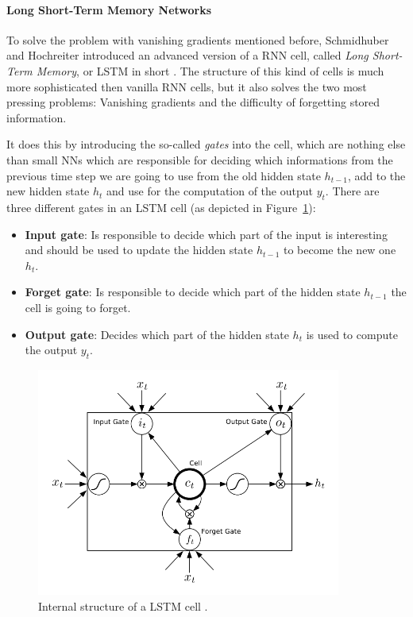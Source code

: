 \paragraph{Long Short-Term Memory Networks} To solve the problem with vanishing gradients mentioned before, Schmidhuber and Hochreiter introduced an advanced version of a RNN cell, called \emph{Long Short-Term Memory}, or LSTM in short \cite{Hochreiter:1997}. The structure of this kind of cells is much more sophisticated then vanilla RNN cells, but it also solves the two most pressing problems: Vanishing gradients and the difficulty of forgetting stored information.

It does this by introducing the so-called \emph{gates} into the cell, which are nothing else than small NNs which are responsible for deciding which informations from the previous time step we are going to use from the old hidden state $h_{t-1}$, add to the new hidden state $h_t$ and use for the computation of the output $y_t$. There are three different gates in an LSTM cell (as depicted in Figure~\ref{fundamentals:lstm:internal_structure}):

\begin{itemize}
	\item \textbf{Input gate}: Is responsible to decide which part of the input is interesting and should be used to update the hidden state $h_{t-1}$ to become the new one $h_t$.
	\item \textbf{Forget gate}: Is responsible to decide which part of the hidden state $h_{t-1}$ the cell is going to forget.
	\item \textbf{Output gate}: Decides which part of the hidden state $h_t$ is used to compute the output $y_t$.
\end{itemize}

\begin{figure}[h]
	\centering
	\includegraphics[width=10cm]{img/lstm_internal}
	\caption{Internal structure of a LSTM cell \cite{Graves:2013}.}
	\label{fundamentals:lstm:internal_structure}
\end{figure}

